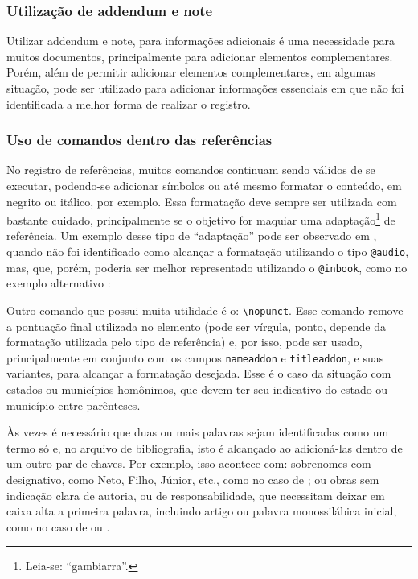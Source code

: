 \subsubsection{Utilização de addendum e note}
Utilizar addendum e note, para informações adicionais é uma necessidade para muitos documentos, principalmente para adicionar elementos complementares. Porém, além de permitir adicionar elementos complementares, em algumas situação, pode ser utilizado para adicionar informações essenciais em que não foi identificada a melhor forma de realizar o registro.

\subsubsection{Uso de comandos dentro das referências}
No registro de referências, muitos comandos continuam sendo válidos de se executar, podendo-se adicionar símbolos ou até mesmo formatar o conteúdo, em negrito ou itálico, por exemplo. Essa formatação deve sempre ser utilizada com bastante cuidado, principalmente se o objetivo for maquiar uma adaptação\footnote{Leia-se: ``gambiarra''.} de referência. Um exemplo desse tipo de ``adaptação'' pode ser observado em \textcite{sonoro:ex3}, quando não foi identificado como alcançar a formatação utilizando o tipo \texttt{@audio}, mas, que, porém, poderia ser melhor representado utilizando o \texttt{@inbook}, como no exemplo alternativo \textcite{sonoro:ex3-alt}:


Outro comando que possui muita utilidade é o: \verb|\nopunct|. Esse comando remove a pontuação final utilizada no elemento (pode ser vírgula, ponto, depende da formatação utilizada pelo tipo de referência) e, por isso, pode ser usado, principalmente em conjunto com os campos \texttt{nameaddon} e \texttt{titleaddon}, e suas variantes, para alcançar a formatação desejada. Esse é o caso da situação com estados ou municípios homônimos, que devem ter seu indicativo do estado ou município entre parênteses.

Às vezes é necessário que duas ou mais palavras sejam identificadas como um termo só e, no arquivo de bibliografia, isto é alcançado ao adicioná-las dentro de um outro par de chaves. Por exemplo, isso acontece com: sobrenomes com designativo, como Neto, Filho, Júnior, etc., como no caso de \textcite{parte-evento:ex2}; ou obras sem indicação clara de autoria, ou de responsabilidade, que necessitam deixar em caixa alta a primeira palavra, incluindo artigo ou palavra monossilábica inicial, como no caso de  ou .
